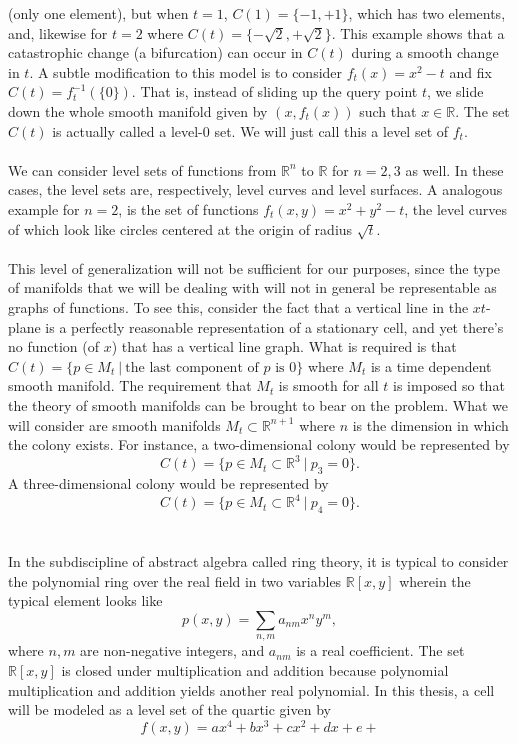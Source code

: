 (only one element), but when $t=1$, $C(1) = \{ -1, +1  \}$, which has two elements, 
and, likewise for $t=2$ where $C(t) = \{ -\sqrt{2}, +\sqrt{2}  \}$. This example 
shows that a catastrophic change (a bifurcation) can occur in $C(t)$ during a smooth 
change in $t$. A subtle modification to this model is to consider $f_t(x) = x^2-t$ 
and fix $C(t) = f^{-1}_t(\{0 \})$. That is, instead of sliding up the query point $t$, 
we slide down the whole smooth manifold given by $(x,f_t(x))$ such that $x \in \mathbb{R}$. 
The set $C(t)$ is actually called a level-$0$ set. We will just call this a level set of $f_t$.
\\
\\
We can consider level sets of functions from $\mathbb{R}^n$ to $\mathbb{R}$ for $n = 2,3$ 
as well. In these cases, the level sets are, respectively, level curves and level surfaces. 
A analogous example for $n=2$, is the set of functions $f_t(x,y) = x^2+y^2-t$, the level 
curves of which look like circles centered at the origin of radius $\sqrt{t}$.
\\
\\
This level of generalization will not be sufficient for our purposes, since the 
type of manifolds that we will be dealing with will not in general be representable 
as graphs of functions. To see this, consider the fact that a vertical line in the 
$xt$-plane is a perfectly reasonable representation of a stationary cell, and yet 
there's no function (of $x$) that has a vertical line graph. What is required is 
that $C(t) = \{ p \in M_t \ | \ \textrm{the last component of $p$ is $0$} \}$ where 
$M_t$ is a time dependent smooth manifold. The requirement that $M_t$ is smooth for 
all $t$ is imposed so that the theory of smooth manifolds can be brought to bear on 
the problem. What we will consider are smooth manifolds $M_t \subset \mathbb{R}^{n+1}$ 
where $n$ is the dimension in which the colony exists. For instance, a two-dimensional 
colony would be represented by
\begin{equation}
        C(t) = \{ p \in M_t \subset \mathbb{R}^3 \ | \ p_3 = 0  \}.
\end{equation}
A three-dimensional colony would be represented by
\begin{equation}
        C(t) = \{ p \in M_t \subset \mathbb{R}^4 \ | \ p_4 = 0  \}.
\end{equation}
\\
\\
In the subdiscipline of abstract algebra called ring theory, it is typical to 
consider the polynomial ring over the real field in two variables $\mathbb{R}[x,y]$ 
wherein the typical element looks like
\begin{equation}
    p(x,y) = \sum_{n,m} a_{nm} x^n y^m,
\end{equation}
where $n,m$ are non-negative integers, and $a_{nm}$ is a real coefficient.
The set $\mathbb{R}[x,y]$ is closed under multiplication and addition because 
polynomial multiplication and addition yields another real polynomial. In this 
thesis, a cell will be modeled as a level set of the quartic given by
\begin{equation}
    f(x,y) = ax^4 +bx^3+cx^2 +dx +e+
\end{equation}


